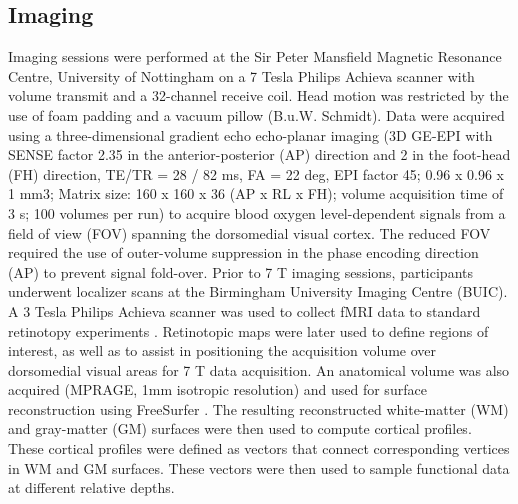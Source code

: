 \subsection{Imaging}
Imaging sessions were performed at the Sir Peter Mansfield Magnetic Resonance Centre, University of Nottingham on a 7 Tesla Philips Achieva scanner with volume transmit and a 32-channel receive coil. Head motion was restricted by the use of foam padding and a vacuum pillow (B.u.W. Schmidt). Data were acquired using a three-dimensional gradient echo echo-planar imaging (3D GE-EPI with SENSE factor 2.35 in the anterior-posterior (AP) direction and 2 in the foot-head (FH) direction, TE/TR = 28 / 82 ms, FA = 22 deg, EPI factor 45; 0.96 x 0.96 x 1 mm3; Matrix size: 160 x 160 x 36 (AP x RL x FH); volume acquisition time of 3 s; 100 volumes per run) to acquire blood oxygen level-dependent signals from a field of view (FOV) spanning the dorsomedial visual cortex. The reduced FOV required the use of outer-volume suppression in the phase encoding direction (AP) to prevent signal fold-over.
Prior to 7 T imaging sessions, participants underwent localizer scans at the Birmingham University Imaging Centre (BUIC). A 3 Tesla Philips Achieva scanner was used to collect fMRI data to standard retinotopy experiments \cite{Preston:2008dg}. Retinotopic maps were later used to define regions of interest, as well as to assist in positioning the acquisition volume over dorsomedial visual areas for 7 T data acquisition. An anatomical volume was also acquired (MPRAGE, 1mm isotropic resolution) and used for surface reconstruction using FreeSurfer \cite{Dale:1999ks,Fischl:1999hg}. The resulting reconstructed white-matter (WM) and gray-matter (GM) surfaces were then used to compute cortical profiles. These cortical profiles were defined as vectors that connect corresponding vertices in WM and GM surfaces. These vectors were then used to sample functional data at different relative depths.
